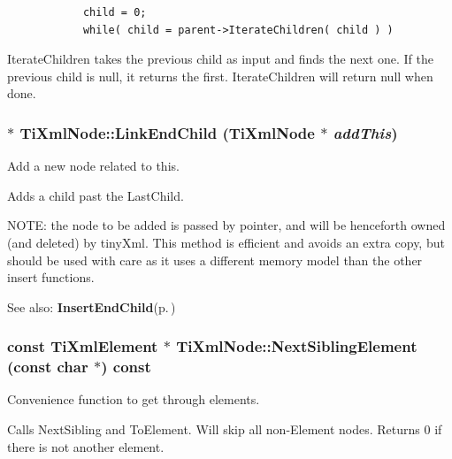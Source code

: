 \footnotesize\begin{verbatim}
			child = 0;
			while( child = parent->IterateChildren( child ) )
		\end{verbatim}
\normalsize


Iterate\-Children takes the previous child as input and finds the next one. If the previous child is null, it returns the first. Iterate\-Children will return null when done.
\subsubsection{ $\ast$ Ti\-Xml\-Node::Link\-End\-Child ({\bf Ti\-Xml\-Node} $\ast$ {\em add\-This})\hspace{0.3cm}{\tt  [inherited]}}\label{classTiXmlNode_TiXmlUnknowna33}


Add a new node related to this. 

Adds a child past the Last\-Child.

NOTE: the node to be added is passed by pointer, and will be henceforth owned (and deleted) by tiny\-Xml. This method is efficient and avoids an extra copy, but should be used with care as it uses a different memory model than the other insert functions.

\begin{Desc}
\item[See also:]{\bf Insert\-End\-Child}{\rm (p.\,\pageref{classTiXmlNode_TiXmlUnknowna32})}\end{Desc}
\subsubsection{\setlength{\rightskip}{0pt plus 5cm}const {\bf Ti\-Xml\-Element} $\ast$ Ti\-Xml\-Node::Next\-Sibling\-Element (const char $\ast$) const\hspace{0.3cm}{\tt  [inherited]}}\label{classTiXmlNode_TiXmlUnknowna52}


Convenience function to get through elements. 

Calls Next\-Sibling and To\-Element. Will skip all non-Element nodes. Returns 0 if there is not another element.
